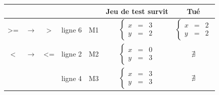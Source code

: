 \documentclass[12pt,a4paper,openany]{book}
\begin{document}
	\begin{tabular}{ccc|ccc|c}
		&&&&&\textbf{Jeu de test survit} & \textbf{Tué}\\
		\hline
		>= & $\rightarrow$ & > & ligne 6 & M1 &
		\begin{minipage}{55pt}
			\begin{displaymath}
				\left\{\begin{array}{ccc}
					x &=&3\\
					y &=&2
				\end{array}
				\right.
			\end{displaymath}
		\end{minipage}
		&
		\begin{minipage}{55pt}
			\begin{displaymath}
				\left\{\begin{array}{ccc}
					x &=&2\\
					y &=&2
				\end{array}
				\right.
			\end{displaymath}
		\end{minipage}
		\\ 
		\hline
		< & $\rightarrow$ & <= & ligne 2 & M2 & 
		\begin{minipage}{55pt}
			\begin{displaymath}
				\left\{\begin{array}{ccc}
					x &=&0\\
					y &=&3
				\end{array}
				\right.
			\end{displaymath}
		\end{minipage}
		&
		\begin{minipage}{55pt}
			\begin{displaymath}
				\nexists
			\end{displaymath}
		\end{minipage}
		\\ 
		 & & & ligne 4 & M3 & 
		\begin{minipage}{55pt}
			\begin{displaymath}
				\left\{\begin{array}{ccc}
					x &=&3\\
					y &=&3
				\end{array}
				\right.
			\end{displaymath}
		\end{minipage}
		 &
		\begin{minipage}{55pt}
			\begin{displaymath}
				\nexists
			\end{displaymath}

\end{minipage}
\end{tabular}
\end{document}
